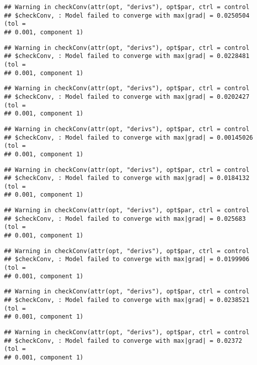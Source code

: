 \documentclass[]{article}
\begin{document}
\begin{verbatim}
## Warning in checkConv(attr(opt, "derivs"), opt$par, ctrl = control
## $checkConv, : Model failed to converge with max|grad| = 0.0250504 (tol =
## 0.001, component 1)
\end{verbatim}

\begin{verbatim}
## Warning in checkConv(attr(opt, "derivs"), opt$par, ctrl = control
## $checkConv, : Model failed to converge with max|grad| = 0.0228481 (tol =
## 0.001, component 1)
\end{verbatim}

\begin{verbatim}
## Warning in checkConv(attr(opt, "derivs"), opt$par, ctrl = control
## $checkConv, : Model failed to converge with max|grad| = 0.0202427 (tol =
## 0.001, component 1)
\end{verbatim}

\begin{verbatim}
## Warning in checkConv(attr(opt, "derivs"), opt$par, ctrl = control
## $checkConv, : Model failed to converge with max|grad| = 0.00145026 (tol =
## 0.001, component 1)
\end{verbatim}

\begin{verbatim}
## Warning in checkConv(attr(opt, "derivs"), opt$par, ctrl = control
## $checkConv, : Model failed to converge with max|grad| = 0.0184132 (tol =
## 0.001, component 1)
\end{verbatim}

\begin{verbatim}
## Warning in checkConv(attr(opt, "derivs"), opt$par, ctrl = control
## $checkConv, : Model failed to converge with max|grad| = 0.025683 (tol =
## 0.001, component 1)
\end{verbatim}

\begin{verbatim}
## Warning in checkConv(attr(opt, "derivs"), opt$par, ctrl = control
## $checkConv, : Model failed to converge with max|grad| = 0.0199906 (tol =
## 0.001, component 1)
\end{verbatim}

\begin{verbatim}
## Warning in checkConv(attr(opt, "derivs"), opt$par, ctrl = control
## $checkConv, : Model failed to converge with max|grad| = 0.0238521 (tol =
## 0.001, component 1)
\end{verbatim}

\begin{verbatim}
## Warning in checkConv(attr(opt, "derivs"), opt$par, ctrl = control
## $checkConv, : Model failed to converge with max|grad| = 0.02372 (tol =
## 0.001, component 1)
\end{verbatim}
\end{document}
